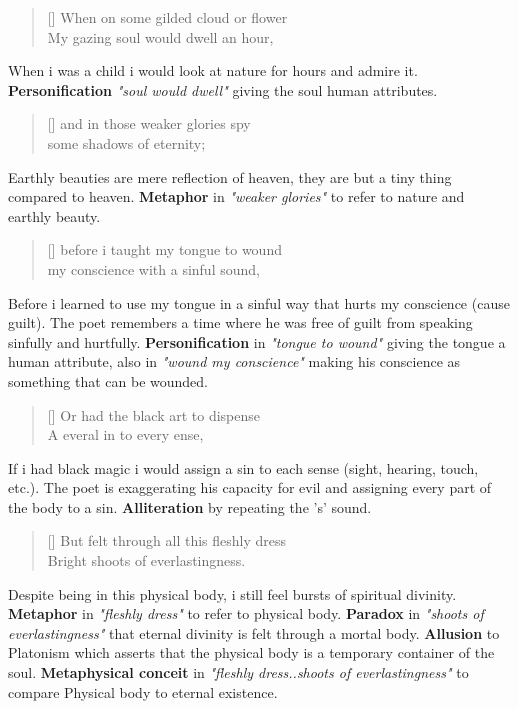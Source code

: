 \begin{verse}[\versewidth]
{\fontverse
When on some gilded cloud or flower\\
My gazing soul would dwell an hour, 
} 
\end{verse}

When i was a child i would look at nature for hours and admire it.
\textbf{Personification} \textit{"soul would dwell"} giving the soul
human attributes. 

\newpage
\begin{verse}[\versewidth]
{\fontverse
and in those weaker glories spy\\
some shadows of eternity;
} 
\end{verse}

Earthly beauties are mere reflection of heaven, they are 
but a tiny thing compared to heaven. \textbf{Metaphor} in 
\textit{"weaker glories"} to refer to nature and earthly beauty. 

\begin{verse}[\versewidth]
{\fontverse
before i taught my tongue to wound\\
my conscience with a sinful sound, 
} 
\end{verse}

Before i learned to use my tongue in a sinful way that hurts
my conscience (cause guilt). The poet remembers a time where he was free of guilt 
from speaking sinfully and hurtfully. \textbf{Personification} in \textit{"tongue to wound"}
giving the tongue a human attribute, also in \textit{"wound my conscience"} making 
his conscience as something that can be wounded. 

\begin{verse}[\versewidth]
{\fontverse
Or had the black art to dispense\\
A everal in to every ense, 
} 
\end{verse}

If i had black magic i would assign a sin to each sense (sight, hearing, touch, etc.).
The poet is exaggerating his capacity for evil and assigning every part of the body to a sin.
\textbf{Alliteration} by repeating the 's' sound.

\begin{verse}[\versewidth]
{\fontverse
But felt through all this fleshly dress\\
Bright shoots of everlastingness.
} 
\end{verse}

Despite being in this physical body, i still feel bursts of spiritual divinity.
 \textbf{Metaphor} in \textit{"fleshly dress"} to refer to physical body.
 \textbf{Paradox} in \textit{"shoots of everlastingness"} that eternal divinity is
felt through a mortal body. \textbf{Allusion} to Platonism which asserts
that the physical body is a temporary container of the soul. \textbf{Metaphysical conceit} 
in \textit{"fleshly dress..shoots of everlastingness"} to compare 
Physical body to eternal existence.


